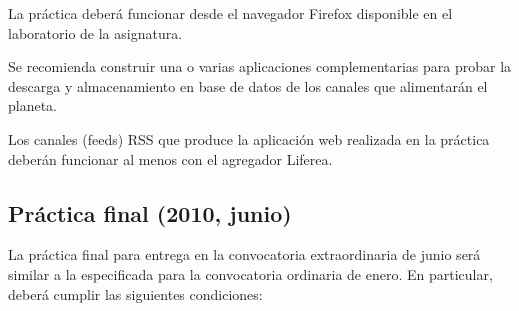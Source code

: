 La práctica deberá funcionar desde el navegador Firefox disponible en el laboratorio de la asignatura.

Se recomienda construir una o varias aplicaciones complementarias para probar la descarga y almacenamiento en base de datos de los canales que alimentarán el planeta.

Los canales (feeds) RSS que produce la aplicación web realizada en la práctica deberán funcionar al menos con el agregador Liferea.

\subsection{Práctica final (2010, junio)}

La práctica final para entrega en la convocatoria extraordinaria de junio será similar a la especificada para la convocatoria ordinaria de enero. En particular, deberá cumplir las siguientes condiciones:

